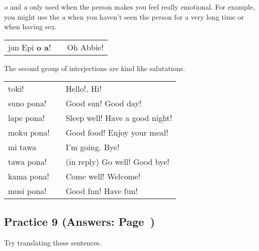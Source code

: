 \textit{o} and \textit{a} only used when the person makes you feel really emotional. 
For example, you might use the \textit{a} when you haven't seen the person for a very long time or when having sex.  

\begin{supertabular}{p{5,5cm}|ll}
jan Epi \textbf{o a}! && Oh Abbie! \\
\end{supertabular} 

The second group of interjections are kind like salutations.

\begin{supertabular}{p{5,5cm}|ll}
toki! && Hello!, Hi! \\
suno pona! && Good sun! Good day! \\
lape pona! && Sleep well! Have a good night! \\
moku pona! && Good food! Enjoy your meal! \\
mi tawa && I'm going. Bye! \\
tawa pona! && (in reply) Go well! Good bye! \\
kama pona! && Come well! Welcome! \\
musi pona! && Good fun! Have fun! \\
\end{supertabular}  
%
\subsection*{Practice 9 (Answers: Page~\pageref{'gender_unofficial_words_etc'})}
%
Try translating these sentences. 


